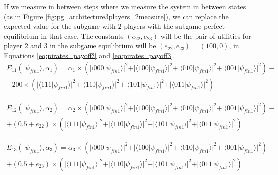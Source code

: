 If we measure in between steps where we measure the system in between states (as in Figure \ref{fig:pg_architecture3players_2measure}), we can replace the expected value for the subgame with $2$ players with the subgame perfect equilibrium in that case. The constants $(e_{22}, e_{23})$ will be the pair of utilities for player 2 and 3 in the subgame equilibrium will be $(e_{22}, e_{23})=(100, 0)$, in Equations \ref{eq:pirates_payoff2} and \ref{eq:pirates_payoff3}.  
 \begin{equation}
\begin{split}
E_{11}(\vert\psi_{fin1}\rangle, \alpha_{1})=\alpha_{1}\times(\vert\langle000\vert\psi_{fin1}\rangle\vert^{2} + \vert\langle100\vert\psi_{fin1}\rangle\vert^{2}
+ \vert\langle010\vert\psi_{fin1}\rangle\vert^{2}
+ \vert\langle001\vert\psi_{fin1}\rangle\vert^{2}
 ) - \\
 - 200\times(\vert\langle111\vert\psi_{fin1}\rangle\vert^{2} + \vert\langle110\vert\psi_{fin1}\rangle\vert^{2}
+ \vert\langle101\vert\psi_{fin1}\rangle\vert^{2}
+ \vert\langle011\vert\psi_{fin1}\rangle\vert^{2}
 )
\end{split}
\end{equation}

 \begin{equation}
\begin{split}
E_{12}(\vert\psi_{fin1}\rangle, \alpha_{2})=\alpha_{2}\times(\vert\langle000\vert\psi_{fin1}\rangle\vert^{2} + \vert\langle100\vert\psi_{fin1}\rangle\vert^{2}
+ \vert\langle010\vert\psi_{fin1}\rangle\vert^{2}
+ \vert\langle001\vert\psi_{fin1}\rangle\vert^{2}
 ) - \\
 + (0.5 + e_{22})\times(\vert\langle111\vert\psi_{fin1}\rangle\vert^{2} + \vert\langle110\vert\psi_{fin1}\rangle\vert^{2}
+ \vert\langle101\vert\psi_{fin1}\rangle\vert^{2}
+ \vert\langle011\vert\psi_{fin1}\rangle\vert^{2}
 )
\end{split}
\label{eq:pirates_payoff2}
\end{equation}

 \begin{equation}
\begin{split}
E_{13}(\vert\psi_{fin1}\rangle, \alpha_{3})=\alpha_{3}\times(\vert\langle000\vert\psi_{fin1}\rangle\vert^{2} + \vert\langle100\vert\psi_{fin1}\rangle\vert^{2}
+ \vert\langle010\vert\psi_{fin1}\rangle\vert^{2}
+ \vert\langle001\vert\psi_{fin1}\rangle\vert^{2}
 ) - \\
 + (0.5 + e_{23})\times(\vert\langle111\vert\psi_{fin1}\rangle\vert^{2} + \vert\langle110\vert\psi_{fin1}\rangle\vert^{2}
+ \vert\langle101\vert\psi_{fin1}\rangle\vert^{2}
+ \vert\langle011\vert\psi_{fin1}\rangle\vert^{2}
 )
\end{split}
\label{eq:pirates_payoff3}
\end{equation}

